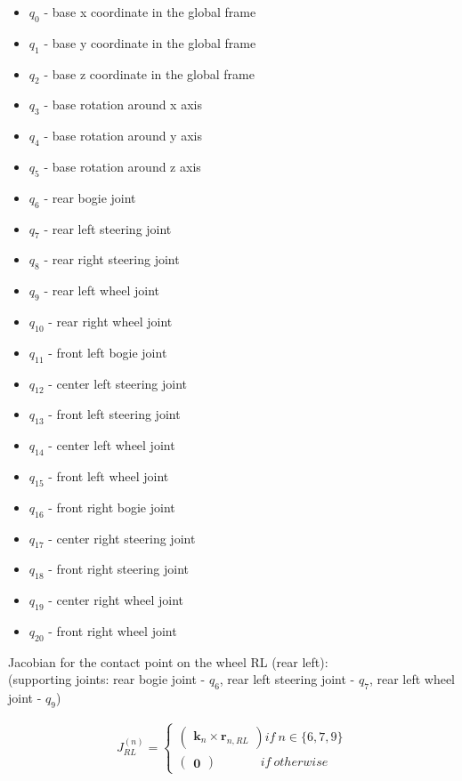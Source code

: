 \documentclass[a4paper]{article}
\begin{document}
\begin{itemize}
\item $q_{0}$ - base x coordinate in the global frame
\item $q_{1}$ - base y coordinate in the global frame
\item $q_{2}$ - base z coordinate in the global frame
\item $q_{3}$ - base rotation around x axis
\item $q_{4}$ - base rotation around y axis
\item $q_{5}$ - base rotation around z axis
\item $q_{6}$ - rear bogie joint 
\item $q_{7}$ - rear left steering joint 
\item $q_{8}$ - rear right steering joint
\item $q_{9}$ - rear left wheel joint
\item $q_{10}$ - rear right wheel joint   
\item $q_{11}$ - front left bogie joint 
\item $q_{12}$ - center left steering joint 
\item $q_{13}$ - front left steering joint 
\item $q_{14}$ - center left wheel joint 
\item $q_{15}$ - front left wheel joint 
\item $q_{16}$ - front right bogie joint 
\item $q_{17}$ - center right steering joint 
\item $q_{18}$ - front right steering joint 
\item $q_{19}$ - center right wheel joint
\item $q_{20}$ - front right wheel joint   
\end{itemize} 

\noindent Jacobian for the contact point on the wheel RL (rear left): \\
\noindent (supporting joints: rear bogie joint - $q_{6}$, rear left steering joint - $q_{7}$, rear left wheel joint - $q_{9}$)

\begin{align}
J^{(n)}_{RL} =
\begin{cases}
        \begin{pmatrix} \boldsymbol{k}_{n} \times \boldsymbol{r}_{n, RL} \end{pmatrix} if \ n \in \{6, 7, 9\}\\
        \begin{pmatrix} \boldsymbol{0} \end{pmatrix} \ \ \ \ \ \ \ \ \ \ \ \ \ \ \ \ if \  otherwise
\end{cases}
\end{align}
\end{document}
